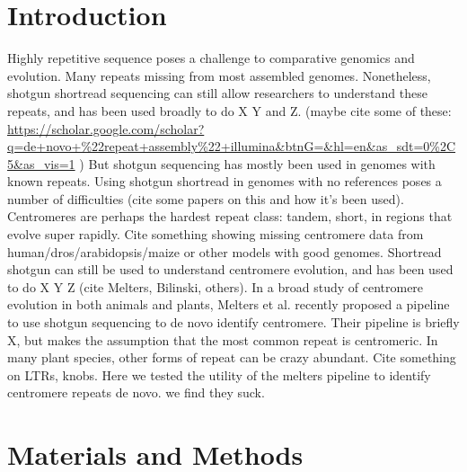 \documentclass[10pt,letterpaper]{article}
\begin{document}
\linenumbers

\section*{Introduction}

Highly repetitive sequence poses a challenge to comparative genomics and evolution. Many repeats missing from most assembled genomes.
Nonetheless, shotgun shortread sequencing can still allow researchers to understand these repeats, and has been used broadly to do X Y and Z. (maybe cite some of these: \url{https://scholar.google.com/scholar?q=de+novo+\%22repeat+assembly\%22+illumina&btnG=&hl=en&as_sdt=0\%2C5&as_vis=1} )
But shotgun sequencing has mostly been used in genomes with known repeats. Using 
shotgun shortread in genomes with no references poses a number of difficulties (cite some papers on this and how it's been used).
Centromeres are perhaps the hardest repeat class: tandem, short, in regions that evolve super rapidly. Cite something showing missing centromere data from human/dros/arabidopsis/maize or other models with good genomes.
Shortread shotgun can still be used to understand centromere evolution, and has been used to do X Y Z (cite Melters, Bilinski, others).
In a broad study of centromere evolution in both animals and plants, Melters et al. recently proposed a pipeline to use shotgun sequencing to de novo identify centromere.  Their pipeline is briefly X, but makes the assumption that the most common repeat is centromeric.  In many plant species, other forms of repeat can be crazy abundant. Cite something on LTRs, knobs.  Here we tested the utility of the melters pipeline to identify centromere repeats de novo. we find they suck.




\section*{Materials and Methods}
\end{document}
